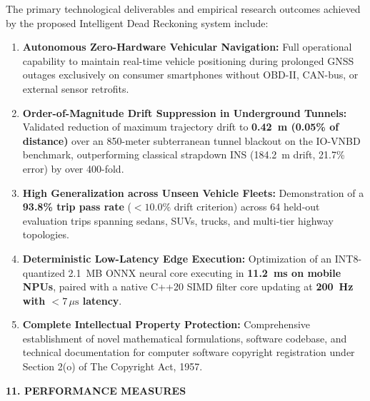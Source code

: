 \documentclass[11pt,a4paper]{article}
\begin{document}
The primary technological deliverables and empirical research outcomes achieved by the proposed Intelligent Dead Reckoning system include:
\begin{enumerate}[leftmargin=0.8cm,itemsep=1.5pt]
\item \textbf{Autonomous Zero-Hardware Vehicular Navigation:} Full operational capability to maintain real-time vehicle positioning during prolonged GNSS outages exclusively on consumer smartphones without OBD-II, CAN-bus, or external sensor retrofits.
\item \textbf{Order-of-Magnitude Drift Suppression in Underground Tunnels:} Validated reduction of maximum trajectory drift to \textbf{0.42~m (0.05\% of distance)} over an 850-meter subterranean tunnel blackout on the IO-VNBD benchmark, outperforming classical strapdown INS (184.2~m drift, 21.7\% error) by over 400-fold.
\item \textbf{High Generalization across Unseen Vehicle Fleets:} Demonstration of a \textbf{93.8\% trip pass rate} ($<10.0\%$ drift criterion) across 64 held-out evaluation trips spanning sedans, SUVs, trucks, and multi-tier highway topologies.
\item \textbf{Deterministic Low-Latency Edge Execution:} Optimization of an INT8-quantized 2.1~MB ONNX neural core executing in \textbf{11.2~ms on mobile NPUs}, paired with a native C++20 SIMD filter core updating at \textbf{200~Hz with $<7\,\mu\text{s}$ latency}.
\item \textbf{Complete Intellectual Property Protection:} Comprehensive establishment of novel mathematical formulations, software codebase, and technical documentation for computer software copyright registration under Section 2(o) of The Copyright Act, 1957.
\end{enumerate}
\vfill
\newpage

\begin{center}
{\large \textbf{11. PERFORMANCE MEASURES}}
\end{center}
\end{document}

